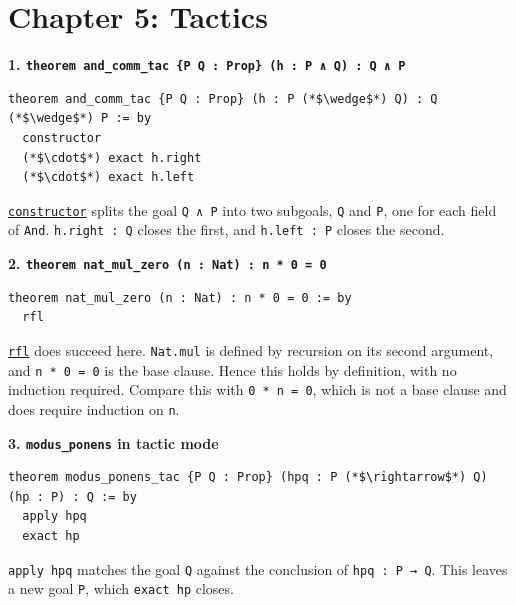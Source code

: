 \section{Chapter 5: Tactics}\label{sec:15-appendix-solutions:04-chapter-5:1}

\textbf{1. \texttt{theorem and\_\allowbreak{}comm\_\allowbreak{}tac \{P Q : Prop\} (h : P ∧ Q) : Q ∧ P}}

\begin{lstlisting}
theorem and_comm_tac {P Q : Prop} (h : P (*$\wedge$*) Q) : Q (*$\wedge$*) P := by
  constructor
  (*$\cdot$*) exact h.right
  (*$\cdot$*) exact h.left
\end{lstlisting}

\href{https://lean-lang.org/doc/reference/latest/Tactic-Proofs/Tactic-Reference/}{\texttt{constructor}} splits the goal \texttt{Q ∧ P} into two subgoals, \texttt{Q} and \texttt{P}, one for each field of \texttt{And}. \texttt{h.right : Q} closes the first, and \texttt{h.left : P} closes the second.

\textbf{2. \texttt{theorem nat\_\allowbreak{}mul\_\allowbreak{}zero (n : Nat) : n * 0 = 0}}

\begin{lstlisting}
theorem nat_mul_zero (n : Nat) : n * 0 = 0 := by
  rfl
\end{lstlisting}

\href{https://lean-lang.org/doc/reference/latest/Tactic-Proofs/Tactic-Reference/}{\texttt{rfl}} does succeed here. \texttt{Nat.mul} is defined by recursion on its second argument, and \texttt{n * 0 = 0} is the base clause. Hence this holds by definition, with no induction required. Compare this with \texttt{0 * n = 0}, which is not a base clause and does require induction on \texttt{n}.

\textbf{3. \texttt{modus\_\allowbreak{}ponens} in tactic mode}

\begin{lstlisting}
theorem modus_ponens_tac {P Q : Prop} (hpq : P (*$\rightarrow$*) Q) (hp : P) : Q := by
  apply hpq
  exact hp
\end{lstlisting}

\texttt{apply hpq} matches the goal \texttt{Q} against the conclusion of \texttt{hpq : P → Q}. This leaves a new goal \texttt{P}, which \texttt{exact hp} closes.
